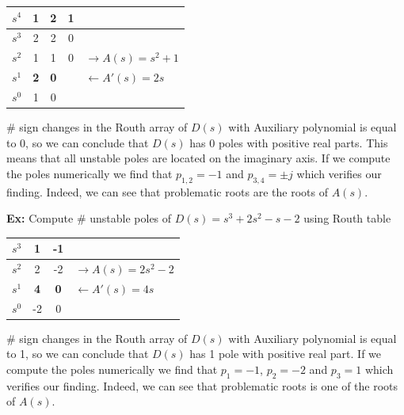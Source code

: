 \documentclass[twoside]{article}
\begin{document}
\vspace{6pt}
\begin{minipage}[h]{1\linewidth}
\begin{center}
\begin{tabular}{|c || c || c c | l |}
\hline
$s^4$ & 1 & 2 & 1 &
\\ \hline
$s^3$ & 2 & 2 & 0 &
\\ \hline
$s^2$ & 1 & 1 & 0 & $\rightarrow A(s) = s^2 + 1$
\\ \hline
$s^1$ & \textbf{2} & \textbf{0} &   & $\leftarrow A'(s) = 2s$
\\ \hline
$s^0$ & 1 & 0 & &
\\ \hline
\end{tabular}
\end{center}
\end{minipage}
\vspace{6pt}

$\#$ sign changes in the Routh array of $D(s)$ with Auxiliary polynomial
is equal to 0, so we can conclude that $D(s)$ has 0 poles with
positive real parts. This means that all unstable poles are located on
the imaginary axis. If we compute the poles numerically we find that
$p_{1,2} = -1$ and $p_{3,4} = \pm j$ which verifies our finding. Indeed,
we can see that problematic roots are the roots of $A(s)$.

\vspace{6pt}

\textbf{Ex:} Compute $\#$ unstable poles of $D(s) = s^3 + 2 s^2 - s - 2 $ using Routh table
%
\begin{table}[h]
\begin{center}
\begin{tabular}{|c || c || c | l |}
\hline
$s^3$ & 1 & -1 & 
\\ \hline
$s^2$ & 2 & -2 & $\rightarrow A(s) = 2 s^2 - 2$
\\ \hline
$s^1$ & \textbf{4} & \textbf{0} & $\leftarrow A'(s) = 4 s$
\\ \hline
$s^0$ & -2 & 0 & 
\\ \hline
\end{tabular}
\end{center}
\end{table}

$\#$ sign changes in the Routh array of $D(s)$ with Auxiliary polynomial
is equal to 1, so we can conclude that $D(s)$ has 1 pole with
positive real part. If we compute the poles numerically we find that
$p_{1} = -1$, $p_2 = -2$ and $p_{3} = 1$ which verifies our finding. Indeed,
we can see that problematic roots is one of the roots of $A(s)$.
\end{document}
